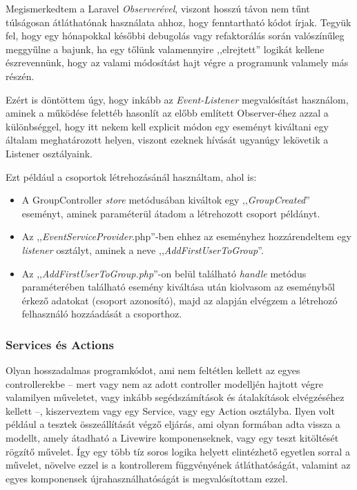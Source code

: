 \documentclass[
]{thesis-ekf}
\theoremstyle{definition}
\theoremstyle{remark}
\begin{document}
                    Megismerkedtem a Laravel \emph{Observerével}, viszont hosszú távon nem tűnt túlságosan átláthatónak használata ahhoz, hogy fenntartható kódot írjak. Tegyük fel, hogy egy hónapokkal későbbi debugolás vagy refaktorálás során valószínűleg meggyűlne a bajunk, ha egy tőlünk valamennyire ,,elrejtett'' logikát kellene észrevennünk, hogy az valami módosítást hajt végre a programunk valamely más részén. 
                    
                    Ezért is döntöttem úgy, hogy inkább az \emph{Event-Listener}\cite{Laravel-Events, Laravel-EventsExample} megvalósítást használom, aminek a működése felettéb hasonlít az előbb említett Observer-éhez azzal a különbséggel, hogy itt nekem kell explicit módon egy eseményt kiváltani egy általam meghatározott helyen, viszont ezeknek hívását ugyanúgy lekövetik a Listener osztályaink.
                    
                    Ezt például a csoportok létrehozásánál használtam, ahol is:
                    \begin{itemize}
                    	\item A GroupController \emph{store} metódusában kiváltok egy ,,\emph{GroupCreated}'' eseményt, aminek paraméterül átadom a létrehozott csoport példányt.
                    	\item Az ,,\emph{EventServiceProvider}.php''-ben ehhez az eseményhez hozzárendeltem egy \emph{listener} osztályt, aminek a neve ,,\emph{AddFirstUserToGroup}''.
                    	\item Az ,,\emph{AddFirstUserToGroup.php}''-on belül található \emph{handle} metódus paraméterében található esemény kiváltása után kiolvasom az eseményből érkező adatokat (csoport azonosító), majd az alapján elvégzem a létrehozó felhasználó hozzáadását a csoporthoz. 
                    \end{itemize}
                    
                    \subsubsection{Services és Actions}
                    Olyan hosszadalmas programkódot, ami nem feltétlen kellett az egyes controllerekbe -- mert vagy nem az adott controller modelljén hajtott végre valamilyen műveletet, vagy inkább segédszámítások és átalakítások elvégzéséhez kellett --, kiszerveztem vagy egy Service, vagy egy Action osztályba. Ilyen volt például a tesztek összeállítását végző eljárás, ami olyan formában adta vissza a modellt, amely átadható a Livewire komponenseknek, vagy egy teszt kitöltését rögzítő művelet. Így egy több tíz soros logika helyett elintézhető egyetlen sorral a művelet, növelve ezzel is a kontrollerem függvényének átláthatóságát, valamint az egyes komponensek újrahasználhatóságát is megvalósítottam ezzel.
\end{document}
